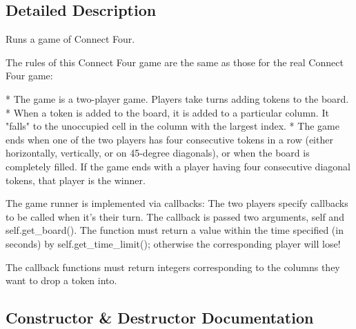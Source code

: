 \subsection{Detailed Description}
\begin{DoxyVerb}Runs a game of Connect Four.

The rules of this Connect Four game are the same as those for the real Connect Four game:

* The game is a two-player game.  Players take turns adding tokens to the board.
* When a token is added to the board, it is added to a particular column.
  It "falls" to the unoccupied cell in the column with the largest index.
* The game ends when one of the two players has four consecutive tokens in a row
  (either horizontally, vertically, or on 45-degree diagonals), or when the board
  is completely filled.  If the game ends with a player having four consecutive
  diagonal tokens, that player is the winner.

The game runner is implemented via callbacks:  The two players specify callbacks to be 
called when it's their turn.  The callback is passed two arguments, self and self.get_board().
The function must return a value within the time specified (in seconds) by self.get_time_limit();
otherwise the corresponding player will lose!

The callback functions must return integers corresponding to the columns they want
to drop a token into.
\end{DoxyVerb}
 

\subsection{Constructor \& Destructor Documentation}
\hypertarget{classconnectfour_1_1_connect_four_runner_a5732bc3d38f772be013ec8bb0b9baeff}{}
